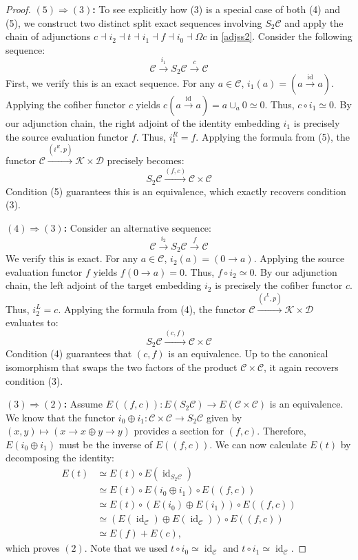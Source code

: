 \documentclass[a4paper,10pt, oneside]{amsart}
\begin{document}
\begin{proof}
		\textbf{$(5) \Rightarrow (3)$:} To see explicitly how (3) is a special case of both (4) and (5), we construct two distinct split exact sequences involving $S_2\mathcal{C}$ and apply the chain of adjunctions $c \dashv i_2 \dashv t \dashv i_1 \dashv f \dashv i_0 \dashv \Omega c$ in \cref{adjss2}.
		Consider the following sequence:
		$$ \mathcal{C} \xrightarrow{i_1} S_2\mathcal{C} \xrightarrow{c} \mathcal{C} $$
		First, we verify this is an exact sequence. For any $a \in \mathcal{C}$, $i_1(a) = (a \xrightarrow{\operatorname{id}} a)$. Applying the cofiber functor $c$ yields $c(a \xrightarrow{\operatorname{id}} a) = a \cup_a 0 \simeq 0$. Thus, $c \circ i_1 \simeq 0$.
	 By our adjunction chain, the right adjoint of the identity embedding $i_1$ is precisely the source evaluation functor $f$. Thus, $i_1^R = f$.
		Applying the formula from (5), the functor $\mathcal{C} \xrightarrow{(i^R, p)} \mathcal{K} \times \mathcal{D}$ precisely becomes:
		$$ S_2\mathcal{C} \xrightarrow{(f, c)} \mathcal{C} \times \mathcal{C} $$
		Condition (5) guarantees this is an equivalence, which exactly recovers condition (3).
		
		\textbf{$(4) \Rightarrow (3)$:}
		Consider an alternative sequence:
		$$ \mathcal{C} \xrightarrow{i_2} S_2\mathcal{C} \xrightarrow{f} \mathcal{C} $$
		We verify this is exact. For any $a \in \mathcal{C}$, $i_2(a) = (0 \to a)$. Applying the source evaluation functor $f$ yields $f(0 \to a) = 0$. Thus, $f \circ i_2 \simeq 0$.
	 By our adjunction chain, the left adjoint of the target embedding $i_2$ is precisely the cofiber functor $c$. Thus, $i_2^L = c$.
		Applying the formula from (4), the functor $\mathcal{C} \xrightarrow{(i^L, p)} \mathcal{K} \times \mathcal{D}$ evaluates to:
		$$ S_2\mathcal{C} \xrightarrow{(c, f)} \mathcal{C} \times \mathcal{C} $$
		Condition (4) guarantees that $(c, f)$ is an equivalence. Up to the canonical isomorphism that swaps the two factors of the product $\mathcal{C} \times \mathcal{C}$, it again recovers condition (3).
		
		\textbf{$(3) \Rightarrow (2)$:} Assume $E((f,c)): E(S_2 \mathcal{C}) \to E(\mathcal{C} \times \mathcal{C})$ is an equivalence. We know that the functor $i_0 \oplus i_1: \mathcal{C} \times \mathcal{C} \to S_2 \mathcal{C}$ given by $(x, y) \mapsto (x \to x \oplus y \to y)$ provides a section for $(f, c)$. Therefore, $E(i_0 \oplus i_1)$ must be the inverse of $E((f, c))$. We can now calculate $E(t)$ by decomposing the identity:
		\begin{align*}
			E(t) &\simeq E(t) \circ E(\operatorname{id}_{S_2 \mathcal{C}}) \\
			&\simeq E(t) \circ E(i_0 \oplus i_1) \circ E((f, c)) \\
			&\simeq E(t) \circ (E(i_0) \oplus E(i_1)) \circ E((f, c)) \\
			&\simeq (E(\operatorname{id}_{\mathcal{C}}) \oplus E(\operatorname{id}_{\mathcal{C}})) \circ E((f, c)) \\
			&\simeq E(f) + E(c),
		\end{align*}
		which proves $(2)$. Note that we used $t \circ i_0 \simeq \operatorname{id}_{\mathcal{C}}$ and $t \circ i_1 \simeq \operatorname{id}_{\mathcal{C}}$.
		

\end{proof}
\end{document}

